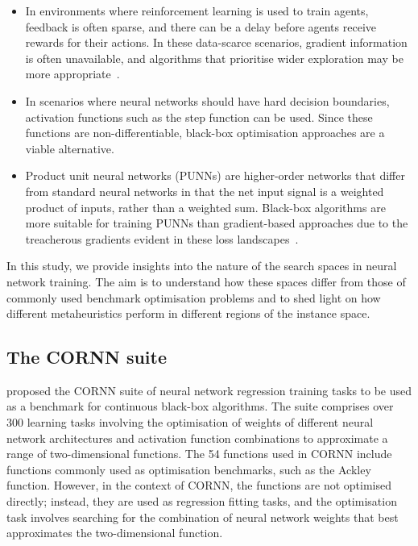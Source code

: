 \documentclass[acmsmall,screen,review,anonymous]{acmart}
\begin{document}
\begin{itemize}
    \item In environments where reinforcement learning is used to train agents, feedback is often sparse, and there can be a delay before agents receive rewards for their actions. In these data-scarce scenarios, gradient information is often unavailable, and algorithms that prioritise wider exploration may be more appropriate~\cite{Salimans2017, Conti2018}. 

    \item In scenarios where neural networks should have hard decision boundaries, activation functions such as the step function can be used. Since these functions are non-differentiable, black-box optimisation approaches are a viable alternative. 
  
    \item Product unit neural networks (PUNNs) are higher-order networks that differ from standard neural networks in that the net input signal is a weighted product of inputs, rather than a weighted sum. Black-box algorithms are more suitable for training PUNNs than gradient-based approaches due to the treacherous gradients evident in these loss landscapes~\cite{Engelbrecht2024}.
\end{itemize}

In this study, we provide insights into the nature of the search spaces in neural network training. The aim is to understand how these spaces differ from those of commonly used benchmark optimisation problems and to shed light on how different metaheuristics perform in different regions of the instance space.

\subsection{The CORNN suite}
\citet{Malan2022} proposed the CORNN suite of neural network regression training tasks to be used as a benchmark for continuous black-box algorithms. The suite comprises over 300 learning tasks involving the optimisation of weights of different neural network architectures and activation function combinations to approximate a range of two-dimensional functions. The 54 functions used in CORNN include functions commonly used as optimisation benchmarks, such as the Ackley function. However, in the context of CORNN, the functions are not optimised directly; instead, they are used as regression fitting tasks, and the optimisation task involves searching for the combination of neural network weights that best approximates the two-dimensional function. 
\end{document}
